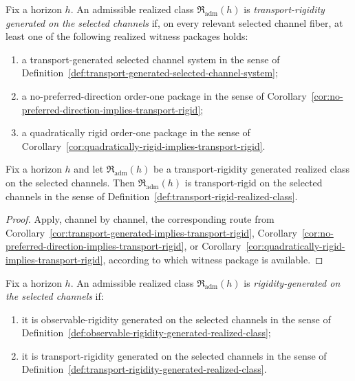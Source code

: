 \begin{definition}
\label{def:transport-rigidity-generated-realized-class}
Fix a horizon $h$. An admissible realized class
$\mathfrak R_{\mathrm{adm}}(h)$ is \emph{transport-rigidity generated on the
selected channels} if, on every relevant selected channel fiber, at least one
of the following realized witness packages holds:
\begin{enumerate}[label=(\roman*), leftmargin=2em, itemsep=0.2em]
\item a transport-generated selected channel system in the sense of
      Definition~\ref{def:transport-generated-selected-channel-system};
\item a no-preferred-direction order-one package in the sense of
      Corollary~\ref{cor:no-preferred-direction-implies-transport-rigid};
\item a quadratically rigid order-one package in the sense of
      Corollary~\ref{cor:quadratically-rigid-implies-transport-rigid}.
\end{enumerate}
\end{definition}

\begin{corollary}
\label{cor:transport-rigidity-generated-implies-rigid}
Fix a horizon $h$ and let $\mathfrak R_{\mathrm{adm}}(h)$ be a
transport-rigidity generated realized class on the selected channels. Then
$\mathfrak R_{\mathrm{adm}}(h)$ is transport-rigid on the selected channels in
the sense of Definition~\ref{def:transport-rigid-realized-class}.
\end{corollary}

\begin{proof}
Apply, channel by channel, the corresponding route from
Corollary~\ref{cor:transport-generated-implies-transport-rigid},
Corollary~\ref{cor:no-preferred-direction-implies-transport-rigid}, or
Corollary~\ref{cor:quadratically-rigid-implies-transport-rigid}, according to
which witness package is available.
\end{proof}

\begin{definition}
\label{def:rigidity-generated-realized-class}
Fix a horizon $h$. An admissible realized class
$\mathfrak R_{\mathrm{adm}}(h)$ is \emph{rigidity-generated on the selected
channels} if:
\begin{enumerate}[label=(\roman*), leftmargin=2em, itemsep=0.2em]
\item it is observable-rigidity generated on the selected channels in the
      sense of
      Definition~\ref{def:observable-rigidity-generated-realized-class};
\item it is transport-rigidity generated on the selected channels in the sense
      of
      Definition~\ref{def:transport-rigidity-generated-realized-class}.
\end{enumerate}
\end{definition}

